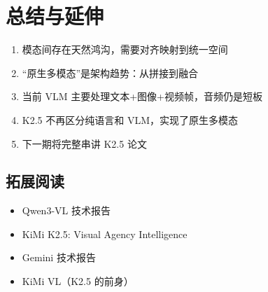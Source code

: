 \section{总结与延伸}

\begin{enumerate}
  \item 模态间存在天然鸿沟，需要对齐映射到统一空间
  \item ``原生多模态''是架构趋势：从拼接到融合
  \item 当前 VLM 主要处理文本+图像+视频帧，音频仍是短板
  \item K2.5 不再区分纯语言和 VLM，实现了原生多模态
  \item 下一期将完整串讲 K2.5 论文
\end{enumerate}

\subsection{拓展阅读}
\begin{itemize}
  \item Qwen3-VL 技术报告
  \item KiMi K2.5: Visual Agency Intelligence
  \item Gemini 技术报告
  \item KiMi VL（K2.5 的前身）
\end{itemize}



